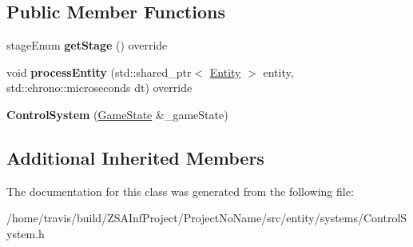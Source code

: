\subsection*{Public Member Functions}
\begin{DoxyCompactItemize}
\item 
\hypertarget{classControlSystem_a0be51ba9211cc5880e2253a64901eb86}{stage\-Enum {\bfseries get\-Stage} () override}\label{classControlSystem_a0be51ba9211cc5880e2253a64901eb86}

\item 
\hypertarget{classControlSystem_a76dd5a8441e30282cc5e1fcacbecf340}{void {\bfseries process\-Entity} (std\-::shared\-\_\-ptr$<$ \hyperlink{classEntity}{Entity} $>$ entity, std\-::chrono\-::microseconds dt) override}\label{classControlSystem_a76dd5a8441e30282cc5e1fcacbecf340}

\item 
\hypertarget{classControlSystem_a293241f3d09fcb898232374cc5e4163d}{{\bfseries Control\-System} (\hyperlink{classGameState}{Game\-State} \&\-\_\-game\-State)}\label{classControlSystem_a293241f3d09fcb898232374cc5e4163d}

\end{DoxyCompactItemize}
\subsection*{Additional Inherited Members}


The documentation for this class was generated from the following file\-:\begin{DoxyCompactItemize}
\item 
/home/travis/build/\-Z\-S\-A\-Inf\-Project/\-Project\-No\-Name/src/entity/systems/Control\-System.\-h\end{DoxyCompactItemize}
